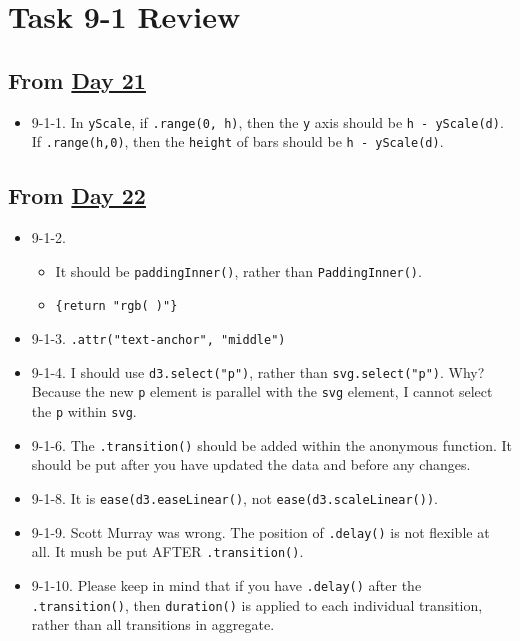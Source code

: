 \documentclass[
]{book}
\providecommand{\tightlist}{%
  \setlength{\itemsep}{0pt}\setlength{\parskip}{0pt}}
\begin{document}
\hypertarget{task-9-1-review}{%
\section{Task 9-1 Review}\label{task-9-1-review}}

\hypertarget{from-day-21-1}{%
\subsection{\texorpdfstring{From \href{https://observablehq.com/@hongtaoh/day-twenty-one-task-9-continued-2020-09-14}{Day 21}}{From Day 21}}\label{from-day-21-1}}

\begin{itemize}
\tightlist
\item
  9-1-1. In \texttt{yScale}, if \texttt{.range(0,\ h)}, then the \texttt{y} axis should be \texttt{h\ -\ yScale(d)}. If \texttt{.range(h,0)}, then the \texttt{height} of bars should be \texttt{h\ -\ yScale(d)}.
\end{itemize}

\hypertarget{from-day-22-2}{%
\subsection{\texorpdfstring{From \href{https://observablehq.com/@hongtaoh/day-twenty-two-spet-15th-2020}{Day 22}}{From Day 22}}\label{from-day-22-2}}

\begin{itemize}
\item
  9-1-2.

  \begin{itemize}
  \tightlist
  \item
    It should be \texttt{paddingInner()}, rather than \texttt{PaddingInner()}.
  \item
    \texttt{\{return\ "rgb(\ )"\}}
  \end{itemize}
\item
  9-1-3. \texttt{.attr("text-anchor",\ "middle")}
\item
  9-1-4. I should use \texttt{d3.select("p")}, rather than \texttt{svg.select("p")}. Why? Because the new \texttt{p} element is parallel with the \texttt{svg} element, I cannot select the \texttt{p} within \texttt{svg}.
\item
  9-1-6. The \texttt{.transition()} should be added within the anonymous function. It should be put after you have updated the data and before any changes.
\item
  9-1-8. It is \texttt{ease(d3.easeLinear()}, not \texttt{ease(d3.scaleLinear())}.
\item
  9-1-9. Scott Murray was wrong. The position of \texttt{.delay()} is not flexible at all. It mush be put AFTER \texttt{.transition()}.
\item
  9-1-10. Please keep in mind that if you have \texttt{.delay()} after the \texttt{.transition()}, then \texttt{duration()} is applied to each individual transition, rather than all transitions in aggregate.
\end{itemize}
\end{document}
